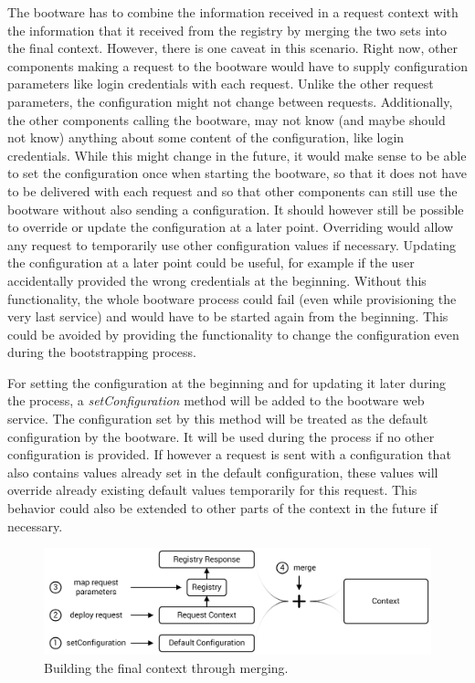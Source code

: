The bootware has to combine the information received in a request context with the information that it received from the registry by merging the two sets into the final context.
However, there is one caveat in this scenario.
Right now, other components making a request to the bootware would have to supply configuration parameters like login credentials with each request.
Unlike the other request parameters, the configuration might not change between requests.
Additionally, the other components calling the bootware, may not know (and maybe should not know) anything about some content of the configuration, like login credentials.
While this might change in the future, it would make sense to be able to set the configuration once when starting the bootware, so that it does not have to be delivered with each request and so that other components can still use the bootware without also sending a configuration.
It should however still be possible to override or update the configuration at a later point.
Overriding would allow any request to temporarily use other configuration values if necessary.
Updating the configuration at a later point could be useful, for example if the user accidentally provided the wrong credentials at the beginning.
Without this functionality, the whole bootware process could fail (even while provisioning the very last service) and would have to be started again from the beginning.
This could be avoided by providing the functionality to change the configuration even during the bootstrapping process.

For setting the configuration at the beginning and for updating it later during the process, a \textit{setConfiguration} method will be added to the bootware web service.
The configuration set by this method will be treated as the default configuration by the bootware.
It will be used during the process if no other configuration is provided.
If however a request is sent with a configuration that also contains values already set in the default configuration, these values will override already existing default values temporarily for this request.
This behavior could also be extended to other parts of the context in the future if necessary.

\begin{figure}[!htbp]
	\centering
	\includegraphics[resolution=600]{design/assets/merge}
	\caption{Building the final context through merging.}
	\label{image:merge}
\end{figure}

